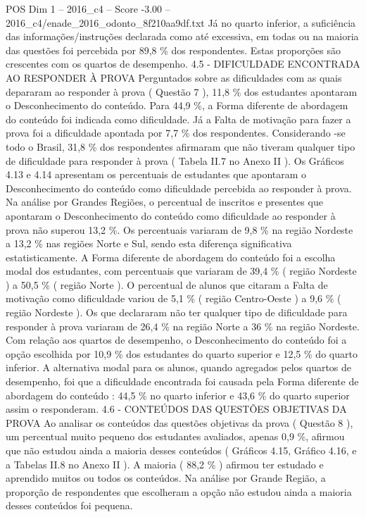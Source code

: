 \begin{textsample}{POS Dim 1 – 2016\_c4 – Score -3.00 – 2016\_c4/enade\_2016\_odonto\_8f210aa9df.txt}
Já no quarto inferior, a suficiência das informações/instruções declarada como até excessiva, em todas ou na maioria das questões foi percebida por 89,8 \% dos respondentes.
Estas proporções são crescentes com os quartos de desempenho. 4.5 - DIFICULDADE ENCONTRADA AO RESPONDER À PROVA Perguntados sobre as dificuldades com as quais depararam ao responder à prova ( Questão 7 ), 11,8 \% dos estudantes apontaram o Desconhecimento do conteúdo.
Para 44,9 \%, a Forma diferente de abordagem do conteúdo foi indicada como dificuldade.
Já a Falta de motivação para fazer a prova foi a dificuldade apontada por 7,7 \% dos respondentes.
Considerando -se todo o Brasil, 31,8 \% dos respondentes afirmaram que não tiveram qualquer tipo de dificuldade para responder à prova ( Tabela II.7 no Anexo II ).
Os Gráficos 4.13 e 4.14 apresentam os percentuais de estudantes que apontaram o Desconhecimento do conteúdo como dificuldade percebida ao responder à prova.
Na análise por Grandes Regiões, o percentual de inscritos e presentes que apontaram o Desconhecimento do conteúdo como dificuldade ao responder à prova não superou 13,2 \%.
Os percentuais variaram de 9,8 \% na região Nordeste a 13,2 \% nas regiões Norte e Sul, sendo esta diferença significativa estatisticamente.
A Forma diferente de abordagem do conteúdo foi a escolha modal dos estudantes, com percentuais que variaram de 39,4 \% ( região Nordeste ) a 50,5 \% ( região Norte ).
O percentual de alunos que citaram a Falta de motivação como dificuldade variou de 5,1 \% ( região Centro-Oeste ) a 9,6 \% ( região Nordeste ).
Os que declararam não ter qualquer tipo de dificuldade para responder à prova variaram de 26,4 \% na região Norte a 36 \% na região Nordeste.
Com relação aos quartos de desempenho, o Desconhecimento do conteúdo foi a opção escolhida por 10,9 \% dos estudantes do quarto superior e 12,5 \% do quarto inferior.
A alternativa modal para os alunos, quando agregados pelos quartos de desempenho, foi que a dificuldade encontrada foi causada pela Forma diferente de abordagem do conteúdo : 44,5 \% no quarto inferior e 43,6 \% do quarto superior assim o responderam. 4.6 - CONTEÚDOS DAS QUESTÕES OBJETIVAS DA PROVA Ao analisar os conteúdos das questões objetivas da prova ( Questão 8 ), um percentual muito pequeno dos estudantes avaliados, apenas 0,9 \%, afirmou que não estudou ainda a maioria desses conteúdos ( Gráficos 4.15, Gráfico 4.16, e a Tabelas II.8 no Anexo II ).
A maioria ( 88,2 \% ) afirmou ter estudado e aprendido muitos ou todos os conteúdos.
Na análise por Grande Região, a proporção de respondentes que escolheram a opção não estudou ainda a maioria desses conteúdos foi pequena.

\end{textsample}
